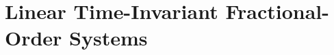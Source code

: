 \documentclass{svproc}
\newcommand{\realnumbers}{\mathbb{R}}
\newcommand{\CderivativeInput}[2]{{}^\mathrm{C}\operatorname{D}_{#2}^{#1}}
\begin{document}
	\section{Linear Time-Invariant Fractional-Order Systems} \label{sec_LTI}
%	
\end{document}
